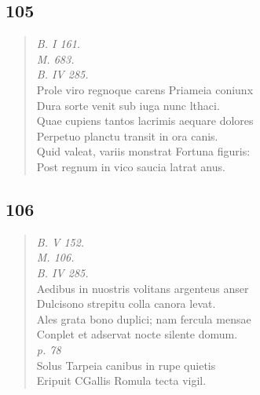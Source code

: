 \documentclass[11pt, a4paper]{report}
\begin{document}
            \subsection*{105}
      \begin{verse}
      \textit{B. I 161.} \\ \textit{M. 683.} \\ \textit{B. IV 285.} \\ Prole viro regnoque carens Priameia coniunx \\ Dura sorte venit sub iuga nunc lthaci. \\ Quae cupiens tantos lacrimis aequare dolores \\ Perpetuo planctu transit in ora canis. \\ Quid valeat, variis monstrat Fortuna figuris: \\ Post regnum in vico saucia latrat anus. \\ 
      \end{verse}
  
            \subsection*{106}
      \begin{verse}
      \textit{B. V 152.} \\ \textit{M. 106.} \\ \textit{B. IV 285.} \\ Aedibus in nuostris volitans argenteus anser \\ Dulcisono strepitu colla canora levat. \\ Ales grata bono duplici; nam fercula mensae \\ Conplet et adservat nocte silente domum. \\ \textit{p. 78} \\ Solus Tarpeia canibus in rupe quietis \\ Eripuit CGallis Romula tecta vigil. \\ 
      \end{verse}
  
\end{document}
